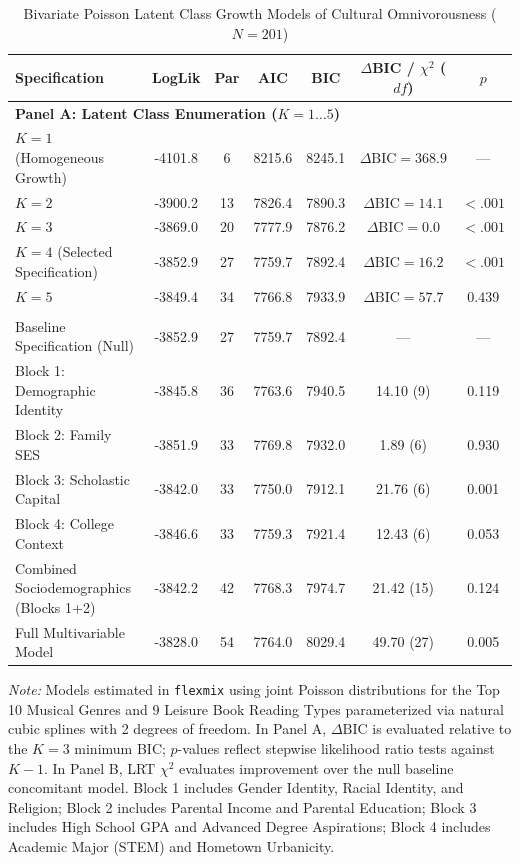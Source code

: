 \documentclass[12pt]{article}
\begin{document}
\begin{table}[htbp]
\centering
\small
\setlength{\tabcolsep}{4.5pt}
\caption{Bivariate Poisson Latent Class Growth Models of Cultural Omnivorousness ($N = 201$)}
\label{tab:bivariate}
\begin{tabular*}{\linewidth}{@{\extracolsep{\fill}}lcccccc@{}}
\toprule
Specification & LogLik & Par & AIC & BIC & $\Delta$BIC / $\chi^2$ ($df$) & $p$ \\
\midrule
\multicolumn{7}{l}{\textbf{Panel A: Latent Class Enumeration ($K = 1 \dots 5$)}} \\
$K = 1$ (Homogeneous Growth) & -4101.8 & 6 & 8215.6 & 8245.1 & $\Delta\text{BIC} = 368.9$ & --- \\
$K = 2$ & -3900.2 & 13 & 7826.4 & 7890.3 & $\Delta\text{BIC} = 14.1$ & $< .001$ \\
$K = 3$ & -3869.0 & 20 & 7777.9 & 7876.2 & $\Delta\text{BIC} = 0.0$ & $< .001$ \\
$K = 4$ (Selected Specification) & -3852.9 & 27 & 7759.7 & 7892.4 & $\Delta\text{BIC} = 16.2$ & $< .001$ \\
$K = 5$ & -3849.4 & 34 & 7766.8 & 7933.9 & $\Delta\text{BIC} = 57.7$ & 0.439 \\
\addlinespace[3pt]
\multicolumn{7}{l}{\textbf{Panel B: Predictive Power of Theoretical Variable Blocks ($K = 4$)}} \\
Baseline Specification (Null) & -3852.9 & 27 & 7759.7 & 7892.4 & --- & --- \\
\quad Block 1: Demographic Identity & -3845.8 & 36 & 7763.6 & 7940.5 & 14.10 (9) & 0.119 \\
\quad Block 2: Family SES & -3851.9 & 33 & 7769.8 & 7932.0 & 1.89 (6) & 0.930 \\
\quad Block 3: Scholastic Capital & -3842.0 & 33 & 7750.0 & 7912.1 & 21.76 (6) & 0.001 \\
\quad Block 4: College Context & -3846.6 & 33 & 7759.3 & 7921.4 & 12.43 (6) & 0.053 \\
\quad Combined Sociodemographics (Blocks 1+2) & -3842.2 & 42 & 7768.3 & 7974.7 & 21.42 (15) & 0.124 \\
\quad Full Multivariable Model & -3828.0 & 54 & 7764.0 & 8029.4 & 49.70 (27) & 0.005 \\
\bottomrule
\end{tabular*}
\begin{minipage}{\linewidth}
\vspace{4pt}
\footnotesize
\textit{Note:} Models estimated in \texttt{flexmix} using joint Poisson distributions for the Top 10 Musical Genres and 9 Leisure Book Reading Types parameterized via natural cubic splines with 2 degrees of freedom. In Panel A, $\Delta\text{BIC}$ is evaluated relative to the $K = 3$ minimum BIC; $p$-values reflect stepwise likelihood ratio tests against $K - 1$. In Panel B, LRT $\chi^2$ evaluates improvement over the null baseline concomitant model. Block 1 includes Gender Identity, Racial Identity, and Religion; Block 2 includes Parental Income and Parental Education; Block 3 includes High School GPA and Advanced Degree Aspirations; Block 4 includes Academic Major (STEM) and Hometown Urbanicity.
\end{minipage}
\end{table}
\end{document}
